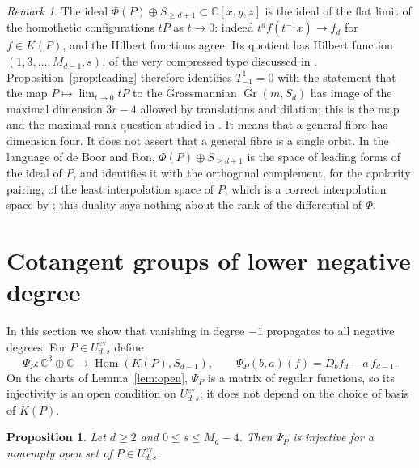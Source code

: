 \documentclass{amsart}
\newtheorem{proposition}[theorem]{Proposition}
\theoremstyle{definition}
\theoremstyle{remark}
\newtheorem{remark}[theorem]{Remark}
\numberwithin{equation}{section}
\newcommand{\CC}{\mathbb{C}}
\DeclareMathOperator{\Gr}{Gr}
\DeclareMathOperator{\Hom}{Hom}
\begin{document}
\begin{remark}\label{rem:homothety}
The ideal $\Phi(P)\oplus S_{\ge d+1}\subset\CC[x,y,z]$ is the ideal of the flat
limit of the homothetic configurations $tP$ as $t\to0$: indeed
$t^df(t^{-1}x)\to f_d$ for $f\in K(P)$, and the Hilbert functions agree. Its
quotient has Hilbert function $(1,3,\dots,M_{d-1},s)$, of the very compressed type
discussed in \cite[Section~2.3]{JelOpen}. Proposition~\ref{prop:leading}
therefore identifies $T^1_{-1}=0$ with the statement that the map
$P\mapsto\lim_{t\to0}tP$ to the Grassmannian $\Gr(m,S_d)$ has image of the
maximal dimension $3r-4$ allowed by translations and dilation; this is the map and
the maximal-rank question studied in \cite[Section~5]{DJNT}. It means that a general
fibre has dimension four. It does not assert that a general fibre is a single orbit. In
the language of de Boor and Ron, $\Phi(P)\oplus S_{\ge d+1}$ is the space of leading forms
of the ideal of $P$, and \cite[Theorem~(4.8)]{deBoorRon} identifies it with the orthogonal
complement, for the apolarity pairing, of the least interpolation space of $P$, which is a
correct interpolation space by \cite[Theorem~(5.8)]{deBoorRon}; this duality says nothing
about the rank of the differential of $\Phi$.
\end{remark}

\section{Cotangent groups of lower negative degree}\label{sec:lower}

In this section we show that vanishing in degree $-1$ propagates to all negative
degrees. For $P\in U^{\mathrm{ev}}_{d,s}$ define
\begin{equation}\label{eq:Psi}
  \Psi_P\colon\CC^3\oplus\CC\to\Hom(K(P),S_{d-1}),\qquad
  \Psi_P(b,a)(f)=D_bf_d-a\,f_{d-1}.
\end{equation}
On the charts of Lemma~\ref{lem:open}, $\Psi_P$ is a matrix of regular functions, so
its injectivity is an open condition on $U^{\mathrm{ev}}_{d,s}$; it does not depend on
the choice of basis of $K(P)$.

\begin{proposition}\label{prop:Psi}
Let $d\ge2$ and $0\le s\le M_d-4$. Then $\Psi_P$ is injective for a nonempty open set
of $P\in U^{\mathrm{ev}}_{d,s}$.
\end{proposition}
\end{document}
